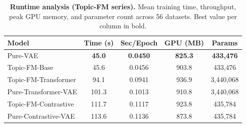 \begin{table}[!htbp]
\centering
\caption{\textbf{Runtime analysis (Topic-FM series).} Mean training time, throughput, peak GPU memory, and parameter count across 56 datasets. Best value per column in bold.}
\label{tab:topic_runtime}
\begin{tabular}{lcccc}
\toprule
Model & Time (s) & Sec/Epoch & GPU (MB) & Params \\
\midrule
Pure-VAE & \textbf{45.0} & \textbf{0.0450} & \textbf{825.3} & \textbf{433,476} \\
Topic-FM-Base & 45.6 & 0.0456 & 903.8 & 433,476 \\
Topic-FM-Transformer & 94.1 & 0.0941 & 936.9 & 3,440,068 \\
Pure-Transformer-VAE & 101.3 & 0.1013 & 910.8 & 3,440,068 \\
Topic-FM-Contrastive & 111.7 & 0.1117 & 923.8 & 435,784 \\
Pure-Contrastive-VAE & 113.6 & 0.1136 & 873.8 & 435,784 \\
\bottomrule
\end{tabular}
\end{table}
